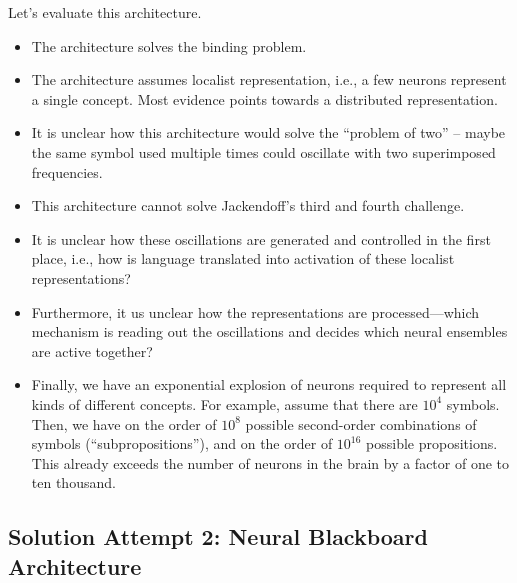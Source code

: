 \documentclass[10pt,letterpaper,oneside]{article}
\begin{document}
Let's evaluate this architecture.
\begin{itemize}
	\item[\OPlus] The architecture solves the binding problem.
	\item[\OMeh] The architecture assumes localist representation, i.e., a few neurons represent a single concept. Most evidence points towards a distributed representation.
	\item[\OMeh] It is unclear how this architecture would solve the \enquote{problem of two} -- maybe the same symbol used multiple times could oscillate with two superimposed frequencies.
	\item[\OMeh] This architecture cannot solve Jackendoff's third and fourth challenge.
	\item[\OMinus] It is unclear how these oscillations are generated and controlled in the first place, i.e., how is language translated into activation of these localist representations?
	\item[\OMinus] Furthermore, it us unclear how the representations are processed---which mechanism is reading out the oscillations and decides which neural ensembles are active together?
	\item[\OMinus] Finally, we have an exponential explosion of neurons required to represent all kinds of different concepts. For example, assume that there are $10^4$ symbols. Then, we have on the order of $10^8$ possible second-order combinations of symbols (\enquote{subpropositions}), and on the order of $10^{16}$ possible propositions. This already exceeds the number of neurons in the brain by a factor of one to ten thousand.
\end{itemize}

\subsection{Solution Attempt 2: Neural Blackboard Architecture}
\end{document}
